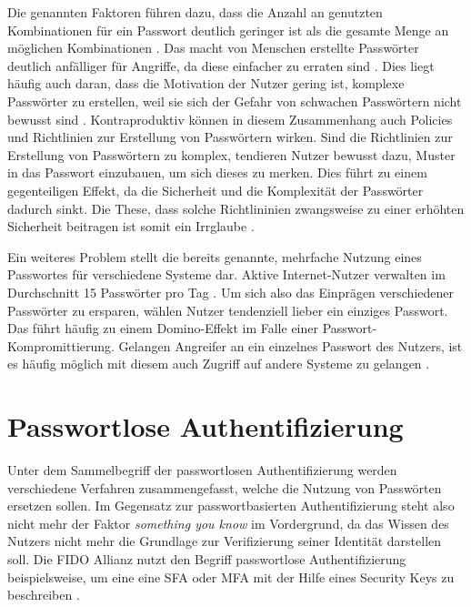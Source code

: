 Die genannten Faktoren führen dazu, dass die Anzahl an genutzten Kombinationen für ein Passwort deutlich geringer ist als die gesamte Menge an möglichen Kombinationen \cite{boonkrong2012security}. Das macht von Menschen erstellte Passwörter deutlich anfälliger für Angriffe, da diese einfacher zu erraten sind \cite{chanda2016password}. Dies liegt häufig auch daran, dass die Motivation der Nutzer gering ist, komplexe Passwörter zu erstellen, weil sie sich der Gefahr von schwachen Passwörtern nicht bewusst sind \cite{yildirim2019encouraging}. Kontraproduktiv können in diesem Zusammenhang auch Policies und Richtlinien zur Erstellung von Passwörtern \cite{yildirim2019encouraging} wirken. Sind die Richtlinien zur Erstellung von Passwörtern zu komplex, tendieren Nutzer bewusst dazu, Muster in das Passwort einzubauen, um sich dieses zu merken. Dies führt zu einem gegenteiligen Effekt, da die Sicherheit und die Komplexität der Passwörter dadurch sinkt. Die These, dass solche Richtlininien zwangsweise zu einer erhöhten Sicherheit beitragen ist somit ein Irrglaube \cite{yildirim2019encouraging} \cite{morii2017research}.

Ein weiteres Problem stellt die bereits genannte, mehrfache Nutzung eines Passwortes für verschiedene Systeme dar. Aktive Internet-Nutzer verwalten im Durchschnitt 15 Passwörter pro Tag \cite{ives2004domino}. Um sich also das Einprägen verschiedener Passwörter zu ersparen, wählen Nutzer tendenziell lieber ein einziges Passwort. Das führt häufig zu einem Domino-Effekt im Falle einer Passwort-Kompromittierung. Gelangen Angreifer an ein einzelnes Passwort des Nutzers, ist es häufig möglich mit diesem auch Zugriff auf andere Systeme zu gelangen \cite{ives2004domino} \cite{morii2017research}. 


\section{Passwortlose Authentifizierung} \label{alts}

Unter dem Sammelbegriff der passwortlosen Authentifizierung werden verschiedene Verfahren zusammengefasst, welche die Nutzung von Passwörten ersetzen sollen. Im Gegensatz zur passwortbasierten Authentifizierung steht also nicht mehr der Faktor \textit{something you know} im Vordergrund, da das Wissen des Nutzers nicht mehr die Grundlage zur Verifizierung seiner Identität darstellen soll. Die \ac{FIDO} Allianz nutzt den Begriff passwortlose Authentifizierung beispielsweise, um eine eine \ac{SFA} oder \ac{MFA} mit der Hilfe eines Security Keys zu beschreiben \cite{farke2020you}. 

